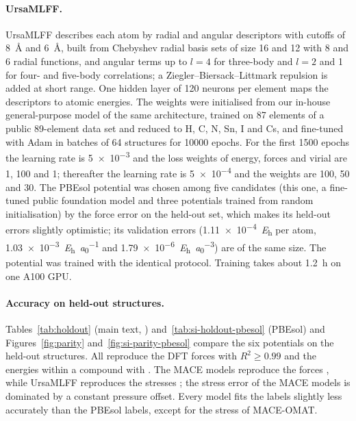 \paragraph{UrsaMLFF.}
UrsaMLFF describes each atom by radial and angular descriptors with cutoffs of \SI{8}{\angstrom}
and \SI{6}{\angstrom}, built from Chebyshev radial basis sets of size 16 and 12 with 8 and 6 radial
functions, and angular terms up to $l = 4$ for three-body and $l = 2$ and 1 for four- and
five-body correlations; a Ziegler--Biersack--Littmark repulsion is added at short range. One hidden
layer of 120 neurons per element maps the descriptors to atomic energies. The weights were
initialised from our in-house general-purpose model of the same architecture, trained on 87
elements of a public 89-element data set\cite{Song2024NEP89} and reduced to H, C, N, Sn, I and Cs,
and fine-tuned with Adam in batches of 64 structures for \num{10000} epochs. For the first 1500
epochs the learning rate is \num{5e-3} and the loss weights of energy, forces and virial are 1,
100 and 1; thereafter the learning rate is \num{5e-4} and the weights are 100, 50 and 30. The
PBEsol potential was chosen among five candidates (this one, a fine-tuned public foundation model
and three potentials trained from random initialisation) by the force error on the held-out set,
which makes its held-out errors slightly optimistic; its validation errors
(\SI{1.11e-4}{\hartree} per atom, \SI{1.03e-3}{\hartree\per\bohr} and
\SI{1.79e-6}{\hartree\per\bohr\cubed}) are of the same size. The \rSCAN{} potential was trained with
the identical protocol. Training takes about \SI{1.2}{h} on one A100 GPU.

\paragraph{Accuracy on held-out structures.}
Tables~\ref{tab:holdout} (main text, \rSCAN{}) and~\ref{tab:si-holdout-pbesol} (PBEsol) and Figures~\ref{fig:parity} and~\ref{fig:si-parity-pbesol} compare the six potentials on the held-out
structures. All reproduce the
DFT forces with $R^2 \ge 0.99$ and the energies within a compound with . The MACE
models reproduce the forces , while UrsaMLFF reproduces the stresses ; the stress error of the MACE models is
dominated by a constant pressure offset. Every model fits the \rSCAN{} labels slightly less accurately than
the PBEsol labels, except for the stress of MACE-OMAT.


